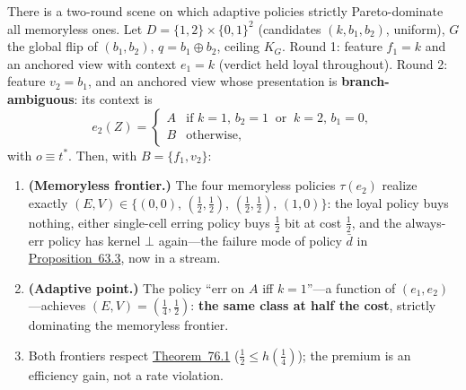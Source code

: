 \begin{thmplain}

There is a two-round scene on which adaptive policies strictly Pareto-dominate all memoryless ones. Let \(D = \{1,2\} \times \{0,1\}^2\) (candidates \((k, b_1, b_2)\), uniform), \(G\) the global flip of \((b_1, b_2)\), \(q = b_1 \oplus b_2\), ceiling \(K_G\). Round 1: feature \(f_1 = k\) and an anchored view with context \(e_1 = k\) (verdict held loyal throughout). Round 2: feature \(v_2 = b_1\), and an anchored view whose presentation is \textbf{branch-ambiguous}: its context is
\[
e_2(Z) = \begin{cases} A & \text{if } k = 1,\, b_2 = 1 \ \text{ or } \ k = 2,\, b_1 = 0,\\ B & \text{otherwise,}\end{cases}
\]
with \(o \equiv t^*\). Then, with \(B = \{f_1, v_2\}\):

\begin{enumerate}
\def\labelenumi{\arabic{enumi}.}
\tightlist
\item
  \textbf{(Memoryless frontier.)} The four memoryless policies \(\tau(e_2)\) realize exactly \((E, V) \in \{(0,0),\, (\tfrac12, \tfrac12),\, (\tfrac12, \tfrac12),\, (1, 0)\}\): the loyal policy buys nothing, either single-cell erring policy buys \(\tfrac12\) bit at cost \(\tfrac12\), and the always-err policy has kernel \(\bot\) again---\hspace{0pt}the failure mode of policy \(\bar d\) in \hyperlink{stmt:63.3}{Proposition~63.3}, now in a stream.
\item
  \textbf{(Adaptive point.)} The policy ``err on \(A\) iff \(k = 1\)''---\hspace{0pt}a function of \((e_1, e_2)\)---\hspace{0pt}achieves \((E, V) = (\tfrac14, \tfrac12)\): \textbf{the same class at half the cost}, strictly dominating the memoryless frontier.
\item
  Both frontiers respect \hyperlink{stmt:76.1}{Theorem~76.1} (\(\tfrac12 \le h(\tfrac14)\)); the premium is an efficiency gain, not a rate violation.
\end{enumerate}
\end{thmplain}

